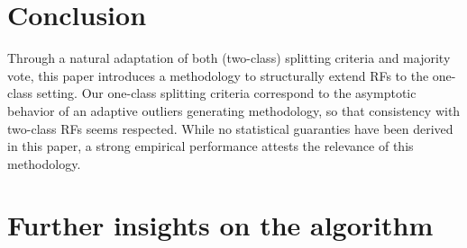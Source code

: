 \section{Conclusion}
Through a natural adaptation of both (two-class) splitting criteria and
majority vote, this paper introduces a methodology to structurally extend RFs
to the one-class setting.
%
Our one-class splitting criteria correspond to the asymptotic behavior of an
adaptive outliers generating methodology, so that consistency with two-class
RFs seems respected.
%
While no statistical guaranties have been derived in this paper, a strong
empirical performance attests the relevance of this methodology.

\section{Further insights on the algorithm}
\label{supp:further_exp}
